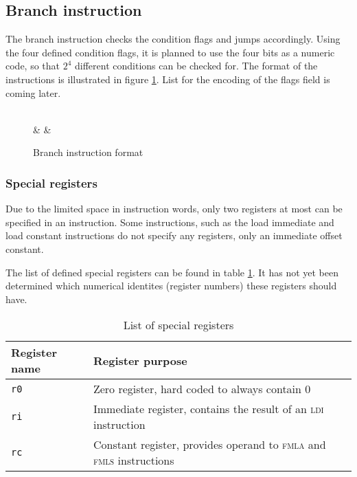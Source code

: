 \subsection{Branch instruction}
The branch instruction checks the condition flags and jumps accordingly. Using
the four defined condition flags, it is planned to use the four bits as a
numeric code, so that $2^4$ different conditions can be checked for.
The format of the instructions is illustrated in figure
\ref{fig:new_branch_format}.
List for the encoding of the flags field is coming later.

\begin{figure}[h]
	\centering
	\begin{bytefield}[endianness=big,bitwidth=0.05\linewidth]{16}
		 \\
		 &
		 &
	\end{bytefield}

	\caption{Branch instruction format}
	\label{fig:new_branch_format}
\end{figure}


\subsubsection{Special registers}

Due to the limited space in instruction words, only two registers at most can be
specified in an instruction. Some instructions, such as the load immediate and
load constant instructions do not specify any registers, only an immediate
offset constant.

The list of defined special registers can be found in table \ref{tab:specregs}.
It has not yet been determined which numerical identites (register numbers)
these registers should have.

\begin{table}[h]
	\centering
	\begin{tabular}{|l l|}
		\hline
		\textbf{Register name} & \textbf{Register purpose} \\
		\hline
		\texttt{r0} & Zero register, hard coded to always contain 0 \\
		\texttt{ri} & Immediate register, contains the result of an \textsc{ldi} instruction\\
		\texttt{rc} & Constant register, provides operand to \textsc{fmla} and \textsc{fmls} instructions \\
		\hline
	\end{tabular}

	\caption{List of special registers}
	\label{tab:specregs}
\end{table}
